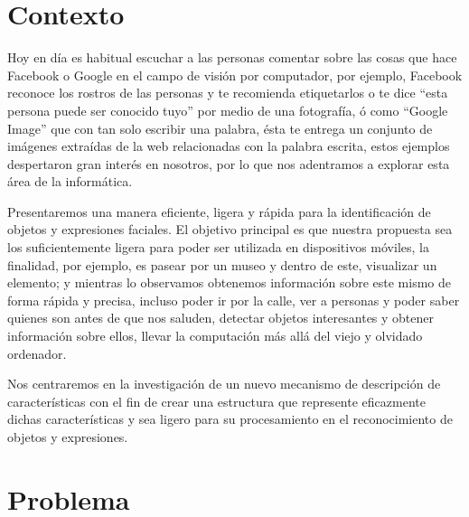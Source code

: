 \section{Contexto}\label{sub:Contexto}

Hoy en día es habitual escuchar a las personas comentar sobre las cosas que hace Facebook o Google en el campo de visión por computador, por ejemplo, Facebook reconoce los rostros de las personas y te recomienda etiquetarlos o te dice ``esta persona puede ser conocido tuyo'' por medio de una fotografía, ó como ``Google Image'' que con tan solo escribir una palabra, ésta te entrega un conjunto de imágenes extraídas de la web relacionadas con la palabra escrita, estos ejemplos despertaron gran interés en nosotros, por lo que nos adentramos a explorar esta área de la informática.

Presentaremos una manera eficiente, ligera y rápida para la identificación de objetos y expresiones faciales. El objetivo principal es que nuestra propuesta sea los suficientemente ligera para poder ser utilizada en dispositivos móviles, la finalidad, por ejemplo, es pasear por un museo y dentro de este, visualizar un elemento; y mientras lo observamos obtenemos información sobre este mismo de forma rápida y precisa, incluso poder ir por la calle, ver a personas y poder saber quienes son antes de que nos saluden, detectar objetos interesantes y obtener información sobre ellos, llevar la computación más allá del viejo y olvidado ordenador.

Nos centraremos en la investigación de un nuevo mecanismo de descripción de características con el fin de crear una estructura que represente eficazmente dichas características y sea ligero para su procesamiento en el reconocimiento de objetos y expresiones.

\section{Problema}\label{sec:problema}

